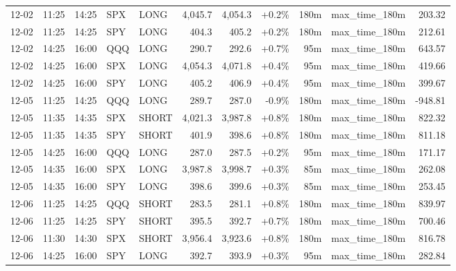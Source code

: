 \documentclass[11pt,a4paper,twoside]{article}
\begin{document}
\begin{center}
\begin{longtable}{>{\color{txtmain}}l l l l l r r r r >{\color{txtmain}}l r}
12-02 & 11:25 & 14:25 & SPX & LONG & 4,045.7 & 4,054.3 & \textcolor{wingreen}{+0.2\%} & 180m & max\_time\_180m & \textcolor{wingreen}{203.32} \\
12-02 & 11:25 & 14:25 & SPY & LONG & 404.3 & 405.2 & \textcolor{wingreen}{+0.2\%} & 180m & max\_time\_180m & \textcolor{wingreen}{212.61} \\
12-02 & 14:25 & 16:00 & QQQ & LONG & 290.7 & 292.6 & \textcolor{wingreen}{+0.7\%} & 95m & max\_time\_180m & \textcolor{wingreen}{643.57} \\
12-02 & 14:25 & 16:00 & SPX & LONG & 4,054.3 & 4,071.8 & \textcolor{wingreen}{+0.4\%} & 95m & max\_time\_180m & \textcolor{wingreen}{419.66} \\
12-02 & 14:25 & 16:00 & SPY & LONG & 405.2 & 406.9 & \textcolor{wingreen}{+0.4\%} & 95m & max\_time\_180m & \textcolor{wingreen}{399.67} \\
12-05 & 11:25 & 14:25 & QQQ & LONG & 289.7 & 287.0 & \textcolor{lossred}{-0.9\%} & 180m & max\_time\_180m & \textcolor{lossred}{-948.81} \\
12-05 & 11:35 & 14:35 & SPX & SHORT & 4,021.3 & 3,987.8 & \textcolor{wingreen}{+0.8\%} & 180m & max\_time\_180m & \textcolor{wingreen}{822.32} \\
12-05 & 11:35 & 14:35 & SPY & SHORT & 401.9 & 398.6 & \textcolor{wingreen}{+0.8\%} & 180m & max\_time\_180m & \textcolor{wingreen}{811.18} \\
12-05 & 14:25 & 16:00 & QQQ & LONG & 287.0 & 287.5 & \textcolor{wingreen}{+0.2\%} & 95m & max\_time\_180m & \textcolor{wingreen}{171.17} \\
12-05 & 14:35 & 16:00 & SPX & LONG & 3,987.8 & 3,998.7 & \textcolor{wingreen}{+0.3\%} & 85m & max\_time\_180m & \textcolor{wingreen}{262.08} \\
12-05 & 14:35 & 16:00 & SPY & LONG & 398.6 & 399.6 & \textcolor{wingreen}{+0.3\%} & 85m & max\_time\_180m & \textcolor{wingreen}{253.45} \\
12-06 & 11:25 & 14:25 & QQQ & SHORT & 283.5 & 281.1 & \textcolor{wingreen}{+0.8\%} & 180m & max\_time\_180m & \textcolor{wingreen}{839.97} \\
12-06 & 11:25 & 14:25 & SPY & SHORT & 395.5 & 392.7 & \textcolor{wingreen}{+0.7\%} & 180m & max\_time\_180m & \textcolor{wingreen}{700.46} \\
12-06 & 11:30 & 14:30 & SPX & SHORT & 3,956.4 & 3,923.6 & \textcolor{wingreen}{+0.8\%} & 180m & max\_time\_180m & \textcolor{wingreen}{816.78} \\
12-06 & 14:25 & 16:00 & SPY & LONG & 392.7 & 393.9 & \textcolor{wingreen}{+0.3\%} & 95m & max\_time\_180m & \textcolor{wingreen}{282.84} \\

\end{longtable}
\end{center}
\end{document}
